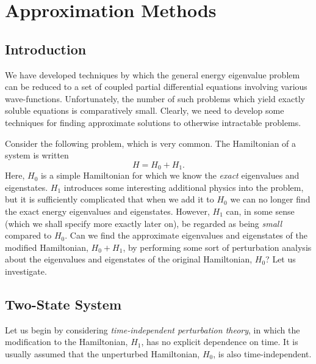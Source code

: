 \chapter{Approximation Methods}
\section{Introduction}
We have developed techniques by which the general energy eigenvalue problem
can be reduced to a set of coupled partial differential equations involving
various wave-functions. Unfortunately, the number of such problems which yield
exactly soluble equations is comparatively small. Clearly, we need to develop some techniques for finding
approximate solutions to otherwise intractable problems. 

Consider the following problem, which is very common. The Hamiltonian of a
system  is  written
\begin{equation}
H = H_0 + H_1.
\end{equation}
Here, $H_0$ is a simple Hamiltonian for which we know
the {\em exact} eigenvalues and eigenstates. $H_1$ introduces some
interesting additional physics into the problem, but it is sufficiently
complicated that when we add it to $H_0$ we can no longer find the exact
energy eigenvalues and eigenstates. However, $H_1$ can, in some sense
(which we shall specify more exactly later on), be regarded as 
being {\em small}\/ compared to $H_0$. Can we find the approximate  eigenvalues
and eigenstates of the modified Hamiltonian, $H_0+H_1$, by performing some
sort of perturbation analysis about the   eigenvalues
and eigenstates of the original Hamiltonian, $H_0$? 
Let us investigate.

\section{Two-State System}
Let us begin by considering {\em time-independent perturbation theory},
in which the modification to the Hamiltonian, $H_1$, has no explicit
dependence on time. It is usually assumed that the unperturbed 
Hamiltonian, $H_0$, is also time-independent. 

